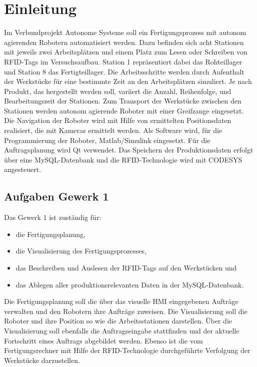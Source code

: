 \chapter{Einleitung}\label{kap:Einleitung}
Im Verbundprojekt Autonome Systeme soll ein Fertigungsprozess mit autonom agierenden Robotern automatisiert werden. Dazu befinden sich acht Stationen mit jeweils zwei Arbeitsplätzen und einem Platz zum Lesen oder Schreiben von RFID-Tags im Versuchsaufbau. Station 1 repräsentiert dabei das Rohteillager und Station 8 das Fertigteillager. Die Arbeitsschritte werden durch Aufenthalt der Werkstücke für eine bestimmte Zeit an den Arbeitsplätzen simuliert. Je nach Produkt, das hergestellt werden soll, variiert die Anzahl, Reihenfolge, und Bearbeitungszeit der Stationen. Zum Transport der Werkstücke zwischen den Stationen werden autonom agierende Roboter mit einer Greifzange eingesetzt. Die Navigation der Roboter wird mit Hilfe von ermittelten Positionsdaten realisiert, die mit Kameras ermittelt werden. Als Software wird, für die Programmierung der Roboter, Matlab/Simulink eingesetzt. Für die Auftragsplanung wird Qt verwendet. Das Speichern der Produktionsdaten erfolgt über eine MySQL-Datenbank und die RFID-Technologie wird mit CODESYS angesteuert.

\section{Aufgaben Gewerk 1}

Das Gewerk 1 ist zuständig für:

\begin{itemize}
    \item die Fertigungsplanung,
    \item die Visualisierung des Fertigungsprozesses,
    \item das Beschreiben und Auslesen der RFID-Tags auf den Werkstücken und
    \item das Ablegen aller produktionsrelevanten Daten in der MySQL-Datenbank.
\end{itemize}

Die Fertigungsplanung soll die über das visuelle HMI eingegebenen Aufträge verwalten und den Robotern ihre Aufträge zuweisen. Die Visualisierung soll die Roboter und ihre Position so wie die Arbeitsstationen darstellen. Über die Visualisierung soll ebenfalls die Auftragseingabe stattfinden und der aktuelle Fortschritt eines Auftrags abgebildet werden. Ebenso ist die vom Fertigungsrechner mit Hilfe der RFID-Technologie durchgeführte Verfolgung der Werkstücke darzustellen.

